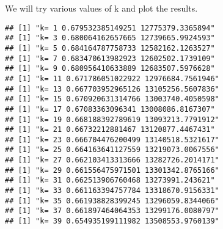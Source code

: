 \documentclass[
]{article}
\newenvironment{Shaded}{\begin{snugshade}}{\end{snugshade}}
\newcommand{\AttributeTok}[1]{\textcolor[rgb]{0.77,0.63,0.00}{#1}}
\newcommand{\ControlFlowTok}[1]{\textcolor[rgb]{0.13,0.29,0.53}{\textbf{#1}}}
\newcommand{\DecValTok}[1]{\textcolor[rgb]{0.00,0.00,0.81}{#1}}
\newcommand{\FunctionTok}[1]{\textcolor[rgb]{0.00,0.00,0.00}{#1}}
\newcommand{\NormalTok}[1]{#1}
\newcommand{\OtherTok}[1]{\textcolor[rgb]{0.56,0.35,0.01}{#1}}
\newcommand{\SpecialCharTok}[1]{\textcolor[rgb]{0.00,0.00,0.00}{#1}}
\newcommand{\StringTok}[1]{\textcolor[rgb]{0.31,0.60,0.02}{#1}}
\begin{document}
We will try various values of k and plot the results.

\begin{Shaded}
\end{Shaded}

\begin{verbatim}
## [1] "k= 1 0.679532385149251 12775379.3365894"
## [1] "k= 3 0.680064162657665 12739665.9924593"
## [1] "k= 5 0.684164787758733 12582162.1263527"
## [1] "k= 7 0.683470613982923 12602502.1739109"
## [1] "k= 9 0.680956410633889 12683507.5976628"
## [1] "k= 11 0.671786051022922 12976684.7561946"
## [1] "k= 13 0.667703952965126 13105256.5607836"
## [1] "k= 15 0.670920631314766 13003740.4050598"
## [1] "k= 17 0.67083363096341 13008086.8167307"
## [1] "k= 19 0.668188392789619 13093213.7791912"
## [1] "k= 21 0.66732212881467 13120877.4467431"
## [1] "k= 23 0.666704476200499 13140518.5321617"
## [1] "k= 25 0.664163641127559 13219073.0067556"
## [1] "k= 27 0.662103413313666 13282726.2014171"
## [1] "k= 29 0.661556475971501 13301342.8765166"
## [1] "k= 31 0.662513906760468 13273991.243621"
## [1] "k= 33 0.661163394757784 13318670.9156331"
## [1] "k= 35 0.661938828399245 13296059.8344066"
## [1] "k= 37 0.661897464064353 13299176.0080797"
## [1] "k= 39 0.654935199111982 13508553.9760139"
\end{verbatim}
\end{document}
